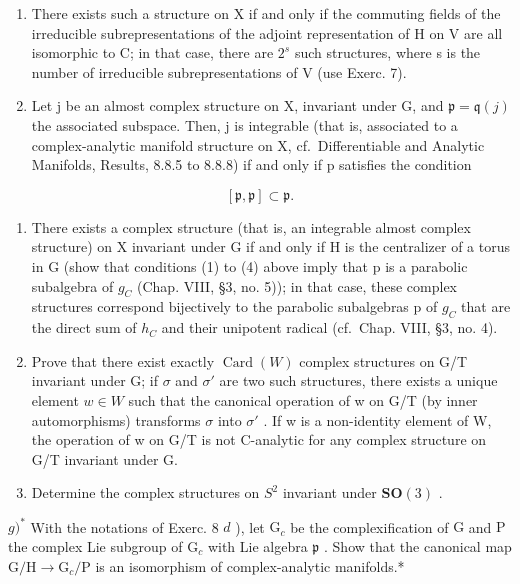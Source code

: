 \begin{enumerate}
\def\labelenumi{\alph{enumi})}
\setcounter{enumi}{1}
\item
  There exists such a structure on X if and only if the commuting fields of the irreducible subrepresentations of the adjoint representation of H on V are all isomorphic to C; in that case, there are \(2^{s}\) such structures, where s is the number of irreducible subrepresentations of V (use Exerc. 7).
\item
  Let j be an almost complex structure on X, invariant under G, and \(\mathfrak{p} = \mathfrak{q}(j)\) the associated subspace. Then, j is integrable (that is, associated to a complex-analytic manifold structure on X, cf.~Differentiable and Analytic Manifolds, Results, 8.8.5 to 8.8.8) if and only if p satisfies the condition
\end{enumerate}

\[
[ \mathfrak {p}, \mathfrak {p} ] \subset \mathfrak {p}.\tag{4}
\]

\begin{enumerate}
\def\labelenumi{\alph{enumi})}
\setcounter{enumi}{3}
\item
  There exists a complex structure (that is, an integrable almost complex structure) on X invariant under G if and only if H is the centralizer of a torus in G (show that conditions (1) to (4) above imply that p is a parabolic subalgebra of \(g_{C}\) (Chap. VIII, §3, no. 5)); in that case, these complex structures correspond bijectively to the parabolic subalgebras p of \(g_{C}\) that are the direct sum of \(h_{C}\) and their unipotent radical (cf.~Chap. VIII, §3, no. 4).
\item
  Prove that there exist exactly \(\operatorname{Card}(W)\) complex structures on G/T invariant under G; if \(\sigma\) and \(\sigma'\) are two such structures, there exists a unique element \(w \in W\) such that the canonical operation of w on G/T (by inner automorphisms) transforms \(\sigma\) into \(\sigma'\) . If w is a non-identity element of W, the operation of w on G/T is not C-analytic for any complex structure on G/T invariant under G.
\item
  Determine the complex structures on \(S^{2}\) invariant under \(\mathbf{SO}(3)\) .
\end{enumerate}

\(g)^{*}\) With the notations of Exerc. 8 \(d\) ), let \(\mathrm{G}_c\) be the complexification of \(\mathrm{G}\) and \(\mathrm{P}\) the complex Lie subgroup of \(\mathrm{G}_c\) with Lie algebra \(\mathfrak{p}\) . Show that the canonical map \(\mathrm{G / H} \to \mathrm{G}_c / \mathrm{P}\) is an isomorphism of complex-analytic manifolds.*

